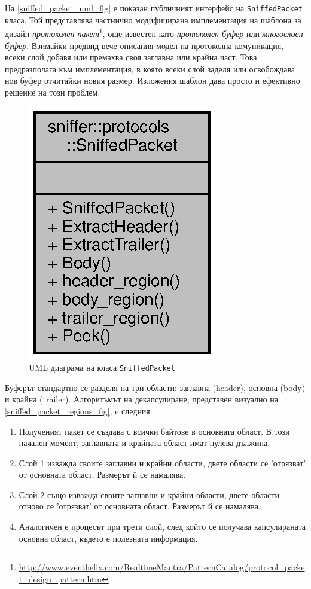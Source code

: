 \documentclass[12pt,a4paper,oneside]{book}
\begin{document}
На \autoref{sniffed_packet_uml_fig} е показан публичният интерфейс на
\texttt{SniffedPacket} класа. Той представлява частнично модифицирана
имплементация на шаблона за дизайн \textit{протоколен
пакет}\footnote{\url{http://www.eventhelix.com/RealtimeMantra/PatternCatalog/protocol_packet_design_pattern.htm}}, още известен като
\textit{протоколен буфер} или \textit{многослоен буфер}. Взимайки предвид
вече описания модел на протоколна комуникация,
всеки слой добавя или премахва своя заглавна или крайна част.
Това предразполага към имплементация, в която всеки слой заделя или освобождава
нов буфер отчитайки новия размер. Изложения шаблон дава просто и ефективно
решение на този проблем.

\begin{figure}[h!]
  \centering
  \includegraphics[scale=.7]{figures/sniffed_packet_uml.eps}
  \caption{UML диаграма на класа \texttt{SniffedPacket}}
  \label{sniffed_packet_uml_fig}
\end{figure}

Буферът стандартно се разделя на три области: заглавна (header), основна (body)
и крайна (trailer).
Алгоритъмът на декапсулиране, представен визуално на
\autoref{sniffed_packet_regions_fig}, e следния:

\begin{enumerate}
  \item
    Полученият пакет се създава с всички байтове в основната област. В този начален
    момент, заглавната и крайната област имат нулева дължина.
\item
  Слой 1 изважда своите заглавни и крайни области, двете области се 'отрязват' от
  основната област. Размерът й се намалява.
\item
  Слой 2 също изважда своите заглавни и крайни области, двете области отново се
  'отрязват' от основната област. Размерът й се намалява.
\item
  Аналогичен е процесът при трети слой, след който се получава капсулираната
  основна област, където е полезната информация.
\end{enumerate}
\end{document}

